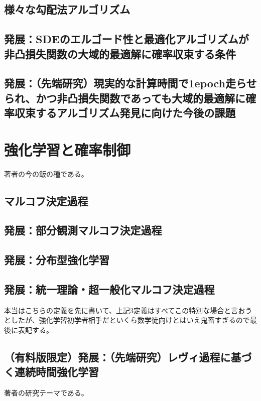 \documentclass{jsarticle}
\begin{document}
\subsection{様々な勾配法アルゴリズム}



\subsection{発展：SDEのエルゴード性と最適化アルゴリズムが非凸損失関数の大域的最適解に確率収束する条件}


\subsection{発展：（先端研究）現実的な計算時間で1epoch走らせられ、かつ非凸損失関数であっても大域的最適解に確率収束するアルゴリズム発見に向けた今後の課題}

\newpage

\section{強化学習と確率制御}
著者の今の飯の種である。
\subsection{マルコフ決定過程}



\subsection{発展：部分観測マルコフ決定過程}




\subsection{発展：分布型強化学習}


\subsection{発展：統一理論・超一般化マルコフ決定過程}
本当はこちらの定義を先に書いて、上記3定義はすべてこの特別な場合と言おうとしたが、強化学習初学者相手だといくら数学徒向けとはいえ鬼畜すぎるので最後に表記する。


\subsection{（有料版限定）発展：（先端研究）レヴィ過程に基づく連続時間強化学習}
著者の研究テーマである。
\end{document}

